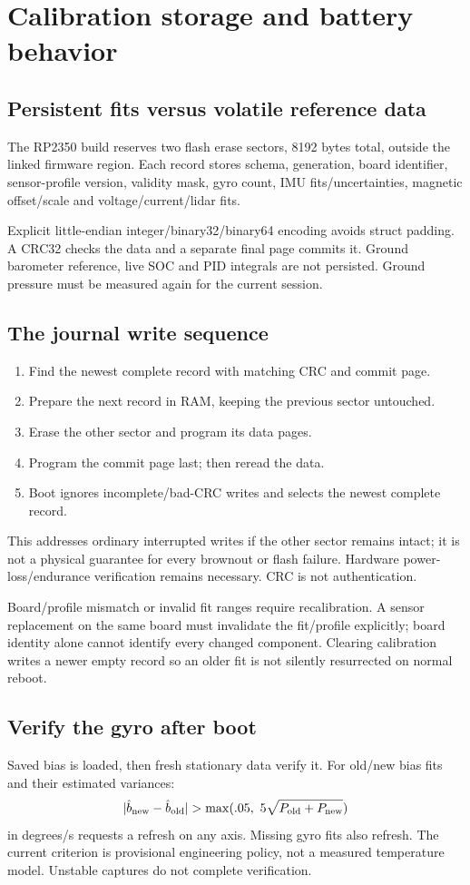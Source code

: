 \chapter{Calibration storage and battery behavior}
\section{Persistent fits versus volatile reference data}
The RP2350 build reserves two flash erase sectors, 8192 bytes total, outside the
linked firmware region. Each record stores schema, generation, board identifier,
sensor-profile version, validity mask, gyro count, IMU fits/uncertainties,
magnetic offset/scale and voltage/current/lidar fits.

Explicit little-endian integer/binary32/binary64 encoding avoids struct padding.
A CRC32 checks the data and a separate final page commits it.
Ground barometer reference, live SOC and PID integrals are not persisted.
Ground pressure must be measured again for the current session.

\section{The journal write sequence}
\begin{enumerate}
\item Find the newest complete record with matching CRC and commit page.
\item Prepare the next record in RAM, keeping the previous sector untouched.
\item Erase the other sector and program its data pages.
\item Program the commit page last; then reread the data.
\item Boot ignores incomplete/bad-CRC writes and selects the newest complete record.
\end{enumerate}
This addresses ordinary interrupted writes if the other sector remains intact;
it is not a physical guarantee for every brownout or flash failure. Hardware
power-loss/endurance verification remains necessary. CRC is not authentication.

Board/profile mismatch or invalid fit ranges require recalibration.
A sensor replacement on the same board must invalidate the fit/profile explicitly;
board identity alone cannot identify every changed component.
Clearing calibration writes a newer empty record so an older fit is not silently
resurrected on normal reboot.

\section{Verify the gyro after boot}
Saved bias is loaded, then fresh stationary data verify it.
For old/new bias fits and their estimated variances:
\begin{equation}
|\hat b_{\rm new}-\hat b_{\rm old}|>
\max(.05,\ 5\sqrt{P_{\rm old}+P_{\rm new}})
\end{equation}
in degrees/s requests a refresh on any axis. Missing gyro fits also refresh.
The current criterion is provisional engineering policy, not a measured
temperature model. Unstable captures do not complete verification.


